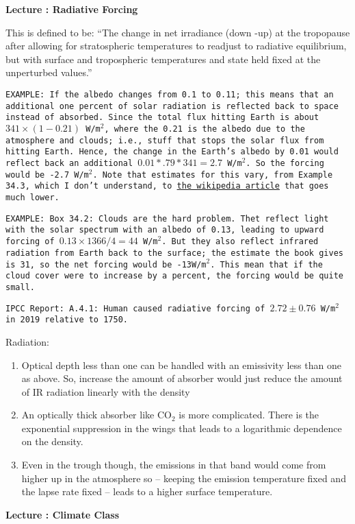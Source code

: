 \documentclass[11pt]{book}
\newcommand\example[1]{{\tt EXAMPLE: #1}}
\newcommand\bee{\begin{enumerate}}
\newcommand\eee{\end{enumerate}}
\newcommand\lecture[1]{\newpage
\addtocounter{lectureno}{1}
\setcounter{secno}{0}
\begin{center}
 {\bf Lecture \arabic{lectureno}: #1}
\end{center}
}
\newcounter{lectureno}
\newcounter{secno}
\begin{document}
\newcommand\ipcc[1]{{\tt IPCC Report: #1}}

\lecture{Radiative Forcing}

This is defined to be: ``The change in net irradiance (down -up) at the tropopause after allowing for stratospheric temperatures to readjust to radiative equilibrium, but with surface and tropospheric temperatures and state held fixed at the unperturbed values.'' 

\example{If the albedo changes from 0.1 to 0.11; this means that an additional one percent of solar radiation is reflected back to space instead of absorbed. Since the total flux hitting Earth is about $341\times(1-0.21)$ W/m$^2$, where the 0.21 is the albedo due to the atmosphere and clouds; i.e., stuff that stops the solar flux from hitting Earth. Hence, the change in the Earth's albedo by 0.01 would reflect back an additional $0.01*.79*341=2.7$ W/m$^2$. So the forcing would be -2.7 W/m$^2$. Note that estimates for this vary, from Example 34.3, which I don't understand, to \href{https://en.wikipedia.org/wiki/Radiative_forcing}{the wikipedia article} that goes much lower.}

\example{Box 34.2: Clouds are the hard problem. Thet reflect light with the solar spectrum with an albedo of 0.13, leading to upward forcing of $0.13\times1366/4=44$ W/m$^2$. But they also reflect infrared radiation from Earth back to the surface; the estimate the book gives is 31, so the net forcing would be -13W/m$^2$. This mean that if the cloud cover were to increase by a percent, the forcing would be quite small.}

\ipcc{A.4.1: Human caused radiative forcing of $2.72\pm 0.76$ W/m$^2$ in 2019 relative to 1750.}


Radiation:
\bee
\item Optical depth less than one can be handled with an emissivity less than one as above. So, increase the amount of absorber would just reduce the amount of IR radiation linearly with the density
\item An optically thick absorber like CO$_2$ is more complicated. There is the exponential suppression in the wings that leads to a logarithmic dependence on the density.
\item Even in the trough though, the emissions in that band would come from higher up in the atmosphere so -- keeping the emission temperature fixed and the lapse rate fixed -- leads to a higher surface temperature.
\eee 

\appendix
\newcommand\ans[1]{{\tt #1}}
\lecture{Climate Class}
\end{document}
